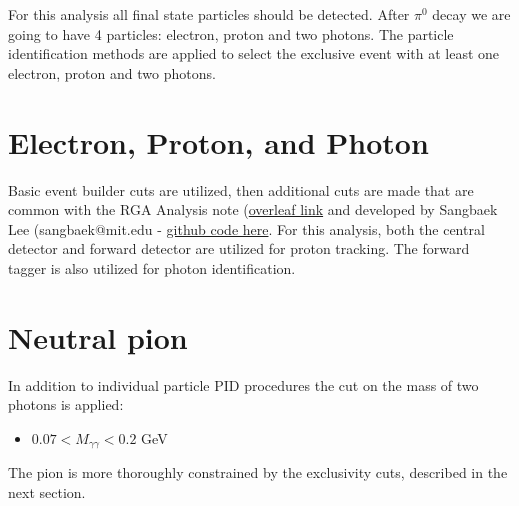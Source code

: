 
For this analysis all final state particles should be detected.
After $\pi^0$ decay we are going to have 4 particles: electron, proton and two photons.
The particle identification methods are applied to select the exclusive event with at least one electron, proton and two photons. 


\section{Electron, Proton, and Photon}
Basic event builder cuts are utilized, then additional cuts are made that are common with the RGA Analysis note (\href{https://www.overleaf.com/project/5ea737720942930001ff5e9c}{overleaf link} and developed by Sangbaek Lee (sangbaek@mit.edu - \href{https://github.com/Sangbaek/analysis_code/tree/analysis/pid}{github code here}. For this analysis, both the central detector and forward detector are utilized for proton tracking. The forward tagger is also utilized for photon identification. 



\section{Neutral pion}
In addition to individual particle PID procedures the cut on the mass of two photons is applied:
\begin{itemize}
	\item $0.07<M_{\gamma\gamma}<0.2$ GeV
\end{itemize}
The pion is more thoroughly constrained by the exclusivity cuts, described in the next section.

